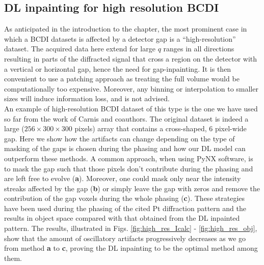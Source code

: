 \subsection{DL inpainting for high resolution BCDI}\label{sec:highres}
As anticipated in the introduction to the chapter, the most prominent case in which a BCDI datasets is affected by 
a detector gap is a ``high-resolution'' dataset. The acquired data here extend for large $q$ ranges in all
directions resulting in parts of the diffracted signal that cross a region 
on the detector with a vertical or horizontal gap, hence the need for gap-inpainting. It is then convenient to use a
patching approach as treating the full volume would be computationally too expensive. Moreover, any binning or interpolation
to smaller sizes will induce information loss, and is not advised. \\
An example of high-resolution BCDI dataset of this type is the one we have used so far from the work of Carnis and coauthors. 
The original dataset is indeed a large ($256\times300\times300$ pixels) array that contains a cross-shaped, 6 pixel-wide 
gap. Here we show how the artifacts can change depending on the type of masking of the gaps is chosen during the phasing
and how our DL model can outperform these methods. 
A common approach, when using PyNX software, is to mask the gap such that those pixels don't contribute during the 
phasing and are left free to evolve (\textbf{a}). Moreover, one could mask only near the intensity streaks affected 
by the gap (\textbf{b}) or simply leave the gap with zeros and remove the contribution of the gap voxels during the whole phasing
(\textbf{c}). These strategies have been used during the phasing of the cited Pt diffraction pattern and the results 
in object space compared with that obtained from the DL inpainted pattern. The results, illustrated in Figs. \ref{fig:high_res_Icalc}
- \ref{fig:high_res_obj}, show that the amount of oscillatory artifacts progressively decreases as we go from method 
\textbf{a} to \textbf{c}, proving the DL inpainting to be the optimal method among them. 

